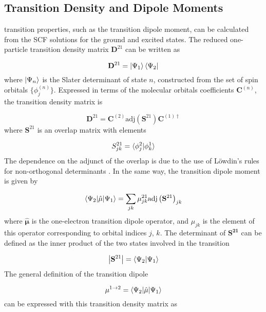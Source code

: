 \subsection{Transition Density and Dipole Moments}
\label{subsec:dscf_transition_density}
\dscf transition properties, such as the transition dipole moment, can be calculated from
the SCF solutions for the ground and excited states. The reduced one-particle transition
density matrix $\mathbf{D}^{21}$ can be written as

\begin{equation}
\mathbf{D}^{21} = \ket{\Psi_1} \bra{\Psi_2}
\end{equation}
%
where $\ket{\Psi_n}$ is the Slater determinant of state $n$, constructed from the
set of spin orbitals $\{ \phi_{j}^{\left(n\right)} \} $. Expressed in terms of the
molecular orbitals coefficients $\mathbf{C}^{\left(n\right)}$, the transition density
matrix is

\begin{equation}
\mathbf{D}^{21} = \mathbf{C}^{\left(2\right)} \text{adj}\left(\mathbf{S}^{21}\right) \mathbf{C}^{\left(1\right) \dagger}
\end{equation}
%
where $\mathbf{S}^{21}$ is an overlap matrix with elements 

\begin{equation}
S^{21}_{jk} = \braket{\phi^2_j|\phi^1_k}
\end{equation}
%
The dependence on the adjunct of the overlap is due to the use of L{\"o}wdin's rules
for non-orthogonal determinants \cite{Lowdin1955}. In the same way, the transition
dipole moment is given by

\begin{equation}
\braket{\Psi_2|\hat{\mathbf{\mu}}|\Psi_1} = \sum_{jk} \mathbf{\mu}_{jk}^{21} \text{adj} \left( \mathbf{S}^{21}\right)_{jk}
\end{equation}
%
where $\hat{\mathbf{\mu}}$ is the one-electron transition dipole operator, and
$\mu_{jk}$ is the element of this operator corresponding to orbital indices $j$, $k$.
The determinant of $\mathbf{S^{21}}$ can be defined as the inner product of the 
two states involved in the transition

\begin{equation}
\left\lvert {\mathbf{S}^{21}} \right\rvert = \braket{\Psi_2|\Psi_1}
\end{equation}
%
The general definition of the transition dipole

\begin{equation}
\mathbf{\mu}^{1\rightarrow2} = \braket{\Psi_2|\hat{\mathbf{\mu}}|\Psi_1}
\end{equation}
%
can be expressed with this transition density matrix as

